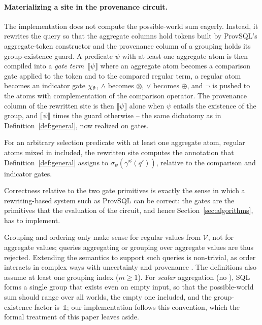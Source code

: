 \begin{toappendix}
\paragraph*{Materializing a site in the provenance circuit.} The
implementation does not compute the possible-world sum eagerly. Instead, it
rewrites the query so that the aggregate columns hold tokens built by
ProvSQL's aggregate-token constructor and the provenance column of a
grouping holds its group-existence guard. A predicate $\psi$ with at
least one aggregate atom is then compiled into a
\emph{gate term}~$\llbracket\psi\rrbracket$ where an aggregate atom becomes a
comparison gate applied to the token and to the compared regular term, a
regular atom becomes an indicator gate $\chi_{\mathrel{\uptheta}}$, $\land$ becomes
$\otimes$, $\lor$ becomes $\oplus$, and $\neg$ is pushed to the atoms
with complementation of the comparison operator. The provenance column of
the rewritten site is then
$\llbracket\psi\rrbracket$ alone when $\psi$ entails the existence of the
group, and $\llbracket\psi\rrbracket$ times the guard otherwise -- the
same dichotomy as in Definition~\ref{def:general}, now realized on gates.
\begin{proposition}\label{prop:site-rewriting}
  For an arbitrary selection predicate with at least one aggregate atom,
  regular atoms mixed in included, the rewritten site computes the
  annotation that Definition~\ref{def:general} assigns to
  $\sigma_\psi(\gamma^{\preceq}(q'))$, relative to the comparison and
  indicator gates.
\end{proposition}
\noindent
Correctness relative to the two gate primitives is exactly the sense in
which a rewriting-based system such as ProvSQL can be correct: the gates
are the primitives that the evaluation of the circuit, and hence
Section~\ref{sec:algorithms}, has to implement.
\end{toappendix}

 Grouping and ordering only make sense for
regular values from $\mathcal{V}$, not for aggregate values; queries
aggregating or grouping over aggregate values are thus rejected.
Extending the semantics to support such queries is non-trivial,
as order interacts in complex ways with uncertainty and provenance
\cite{DBLP:journals/tcs/AmarilliBDS19}.
The definitions also assume at least one grouping index ($m\geq 1$).
For \emph{scalar} aggregation (no ), SQL forms a single
group that exists even on empty input, so that the possible-world sum
should range over all worlds, the empty one included, and the
group-existence factor is~$\mathbb 1$; our implementation follows this
convention, which the formal treatment of this paper leaves aside.
